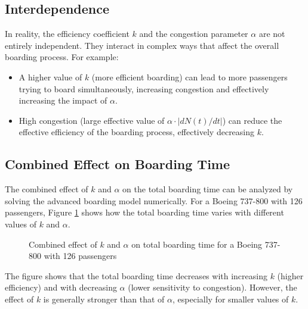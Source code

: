 \documentclass[12pt,a4paper]{article}
\begin{document}
\subsection{Interdependence}

In reality, the efficiency coefficient $k$ and the congestion parameter $\alpha$ are not entirely independent. They interact in complex ways that affect the overall boarding process. For example:

\begin{itemize}
    \item A higher value of $k$ (more efficient boarding) can lead to more passengers trying to board simultaneously, increasing congestion and effectively increasing the impact of $\alpha$.
    \item High congestion (large effective value of $\alpha \cdot |dN(t)/dt|$) can reduce the effective efficiency of the boarding process, effectively decreasing $k$.
\end{itemize}

\subsection{Combined Effect on Boarding Time}

The combined effect of $k$ and $\alpha$ on the total boarding time can be analyzed by solving the advanced boarding model numerically. For a Boeing 737-800 with 126 passengers, Figure \ref{fig:combined_effect} shows how the total boarding time varies with different values of $k$ and $\alpha$.

\begin{figure}[H]
\centering
{}
\caption{Combined effect of $k$ and $\alpha$ on total boarding time for a Boeing 737-800 with 126 passengers}
\label{fig:combined_effect}
\end{figure}

The figure shows that the total boarding time decreases with increasing $k$ (higher efficiency) and with decreasing $\alpha$ (lower sensitivity to congestion). However, the effect of $k$ is generally stronger than that of $\alpha$, especially for smaller values of $k$.
\end{document}
